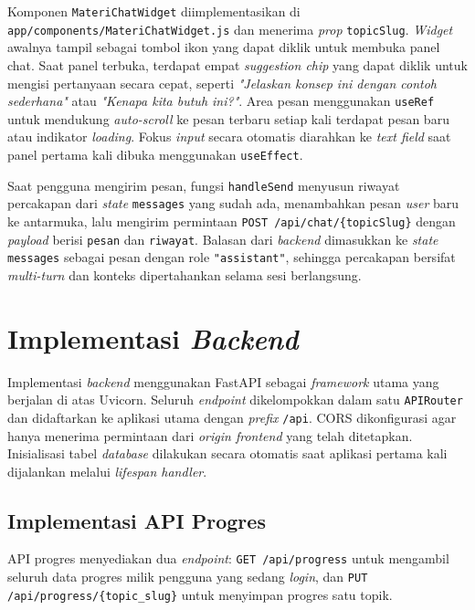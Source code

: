 Komponen \texttt{MateriChatWidget} diimplementasikan di \texttt{app/components/MateriChatWidget.js} dan menerima \textit{prop} \texttt{topicSlug}. \textit{Widget} awalnya tampil sebagai tombol ikon yang dapat diklik untuk membuka panel chat. Saat panel terbuka, terdapat empat \textit{suggestion chip} yang dapat diklik untuk mengisi pertanyaan secara cepat, seperti \textit{"Jelaskan konsep ini dengan contoh sederhana"} atau \textit{"Kenapa kita butuh ini?"}. Area pesan menggunakan \texttt{useRef} untuk mendukung \textit{auto-scroll} ke pesan terbaru setiap kali terdapat pesan baru atau indikator \textit{loading}. Fokus \textit{input} secara otomatis diarahkan ke \textit{text field} saat panel pertama kali dibuka menggunakan \texttt{useEffect}.

Saat pengguna mengirim pesan, fungsi \texttt{handleSend} menyusun riwayat percakapan dari \textit{state} \texttt{messages} yang sudah ada, menambahkan pesan \textit{user} baru ke antarmuka, lalu mengirim permintaan \texttt{POST /api/chat/\{topicSlug\}} dengan \textit{payload} berisi \texttt{pesan} dan \texttt{riwayat}. Balasan dari \textit{backend} dimasukkan ke \textit{state} \texttt{messages} sebagai pesan dengan role \texttt{"assistant"}, sehingga percakapan bersifat \textit{multi-turn} dan konteks dipertahankan selama sesi berlangsung.

\section{Implementasi \textit{Backend}}

Implementasi \textit{backend} menggunakan FastAPI sebagai \textit{framework} utama yang berjalan di atas Uvicorn. Seluruh \textit{endpoint} dikelompokkan dalam satu \texttt{APIRouter} dan didaftarkan ke aplikasi utama dengan \textit{prefix} \texttt{/api}. CORS dikonfigurasi agar hanya menerima permintaan dari \textit{origin frontend} yang telah ditetapkan. Inisialisasi tabel \textit{database} dilakukan secara otomatis saat aplikasi pertama kali dijalankan melalui \textit{lifespan handler}.

\subsection{Implementasi API Progres}

API progres menyediakan dua \textit{endpoint}: \texttt{GET /api/progress} untuk mengambil seluruh data progres milik pengguna yang sedang \textit{login}, dan \texttt{PUT /api/progress/\allowbreak{}\{topic\_slug\}} untuk menyimpan progres satu topik.

